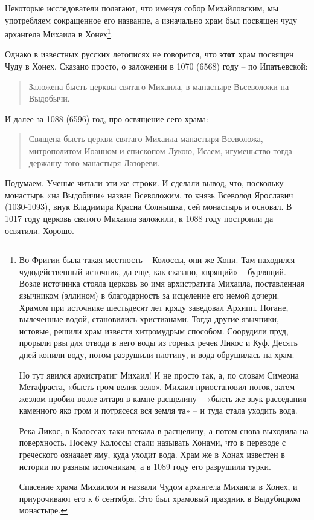 Некоторые исследователи полагают, что именуя собор Михайловским, мы употребляем сокращенное его название, а изначально храм был посвящен чуду архангела Михаила в Хонех\footnote{Во Фригии была такая местность – Колоссы, они же Хони. Там находился чудодейственный источник, да еще, как сказано, «врящий» – бурлящий. Возле источника стояла церковь во имя архистратига Михаила, поставленная язычником (эллином) в благодарность за исцеление его немой дочери. Храмом при источнике шестьдесят лет кряду заведовал Архипп. Погане, вылеченные водой, становились христианами. Тогда другие язычники, истовые, решили храм извести хитромудрым способом. Соорудили пруд, прорыли рвы для отвода в него воды из горных речек Ликос и Куф. Десять дней копили воду, потом разрушили плотину, и вода обрушилась на храм.

Но тут явился архистратиг Михаил! И не просто так, а, по словам Симеона Метафраста, «бысть гром велик зело». Михаил приостановил поток, затем жезлом пробил возле алтаря в камне расщелину – «бысть же звук расседания каменного яко гром и потрясеся вся земля та» – и туда стала уходить вода.

Река Ликос, в Колоссах таки втекала в расщелину, а потом снова выходила на поверхность. Посему Колоссы стали называть Хонами, что в переводе с греческого означает яму, куда уходит вода. Храм же в Хонах известен в истории по разным источникам, а в 1089 году его разрушили турки.

Спасение храма Михаилом и назвали Чудом архангела Михаила в Хонех, и приурочивают его к 6 сентября. Это был храмовый праздник в Выдубицком монастыре.}. 

Однако в известных русских летописях не говорится, что \textbf{этот} храм посвящен Чуду в Хонех. Сказано просто, о заложении в 1070 (6568) году – по Ипатьевской:

\begin{quotation} 
Заложена бысть церквы святаго Михаила, в манастыре Вьсеволожи на Выдобычи.
\end{quotation} 

И далее за 1088 (6596) год, про освящение сего храма:

\begin{quotation} 
Священа бысть церкви святаго Михаила манастыря Всеволожа, митрополитом Иоанном и епископом Лукою, Исаем, игуменьство тогда держашу того манастыря Лазореви.
\end{quotation} 

Подумаем. Ученые читали эти же строки. И сделали вывод, что, поскольку монастырь «на Выдобичи» назван Всеволожим, то князь Всеволод Ярославич (1030-1093), внук Владимира Красна Солнышка, сей монастырь и основал. В 1017 году церковь святого Михаила заложили, к 1088 году построили да освятили. Хорошо. 

